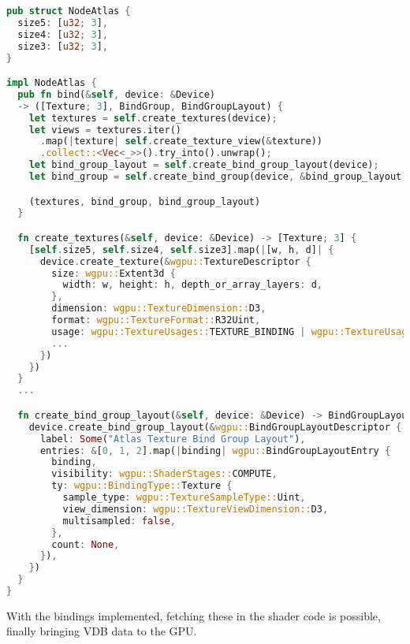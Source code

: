 \begin{lstlisting}[language=rust, captionpos=b, caption={
    \texttt{NodeAtlas} definition: The three fields are the sizes of each atlas.
    The \texttt{create\_textures} creates three textures, sets the correct dimensions and sets value type to \texttt{R32Uint} represent a 4-byte single channel, which can be used depending on what the value represents.
    The \texttt{create\_bind\_group\_layout} prepare the binding for compute shaders, setting the sample type to \texttt{Uint} to ease access to the atlases' data.
},label={atlas2idx}]
pub struct NodeAtlas {
  size5: [u32; 3],
  size4: [u32; 3],
  size3: [u32; 3],
}

impl NodeAtlas {
  pub fn bind(&self, device: &Device)
  -> ([Texture; 3], BindGroup, BindGroupLayout) {
    let textures = self.create_textures(device);
    let views = textures.iter()
      .map(|texture| self.create_texture_view(&texture))
      .collect::<Vec<_>>().try_into().unwrap();
    let bind_group_layout = self.create_bind_group_layout(device);
    let bind_group = self.create_bind_group(device, &bind_group_layout, &views);

    (textures, bind_group, bind_group_layout)
  }

  fn create_textures(&self, device: &Device) -> [Texture; 3] {
    [self.size5, self.size4, self.size3].map(|[w, h, d]| {
      device.create_texture(&wgpu::TextureDescriptor {
        size: wgpu::Extent3d {
          width: w, height: h, depth_or_array_layers: d,
        },
        dimension: wgpu::TextureDimension::D3,
        format: wgpu::TextureFormat::R32Uint,
        usage: wgpu::TextureUsages::TEXTURE_BINDING | wgpu::TextureUsages::COPY_DST,
        ...
      })
    })
  }
  ...

  fn create_bind_group_layout(&self, device: &Device) -> BindGroupLayout {
    device.create_bind_group_layout(&wgpu::BindGroupLayoutDescriptor {
      label: Some("Atlas Texture Bind Group Layout"),
      entries: &[0, 1, 2].map(|binding| wgpu::BindGroupLayoutEntry {
        binding,
        visibility: wgpu::ShaderStages::COMPUTE,
        ty: wgpu::BindingType::Texture {
          sample_type: wgpu::TextureSampleType::Uint,
          view_dimension: wgpu::TextureViewDimension::D3,
          multisampled: false,
        },
        count: None,
      }),
    })
  }
}
\end{lstlisting}
        With the bindings implemented, fetching these in the shader code is possible, finally bringing VDB data to the GPU.


